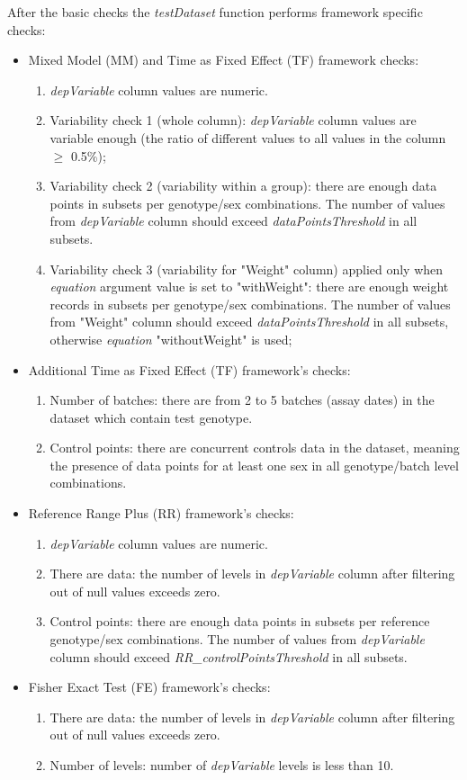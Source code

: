 \documentclass[12pt,a4paper]{article}
\begin{document}
After the basic checks the \textit{testDataset} function performs framework specific checks:
\begin{itemize}
\item Mixed Model (MM) and Time as Fixed Effect (TF) framework checks:
\begin{enumerate}
\item \textit{depVariable} column values are numeric.
\item Variability check 1  (whole column): \textit{depVariable} column values are variable enough (the ratio of different values to all values in the column $\geq$ 0.5\%);
\item Variability check 2 (variability within a group): there are enough data points in subsets per genotype/sex combinations. The number of values from \textit{depVariable} column should exceed \textit{dataPointsThreshold} in all subsets.
\item Variability check 3 (variability for "Weight" column) applied only when \textit{equation} argument value is set to "withWeight": there are enough weight records in subsets per genotype/sex combinations. The number of values from "Weight" column should exceed \textit{dataPointsThreshold} in all subsets, otherwise \textit{equation} "withoutWeight" is used;
\end{enumerate}
\item Additional Time as Fixed Effect (TF) framework's checks:
\begin{enumerate}
\item Number of batches: there are from 2 to 5 batches (assay dates) in the dataset which contain test genotype.
\item Control points: there are concurrent controls data in the dataset, meaning the presence of data points for at least one sex in all genotype/batch level combinations.
\end{enumerate}
\item Reference Range Plus (RR) framework's checks:
\begin{enumerate}
\item \textit{depVariable} column values are numeric.
\item There are data: the number of levels in \textit{depVariable} column after filtering out of null values exceeds zero. 
\item Control points: there are enough data points in subsets per reference genotype/sex combinations. The number of values from \textit{depVariable} column should exceed \textit{RR\_controlPointsThreshold} in all subsets. 
\end{enumerate}
\item Fisher Exact Test (FE) framework's checks: 
\begin{enumerate}
\item There are data: the number of levels in \textit{depVariable} column after filtering out of null values exceeds zero.
\item Number of levels: number of \textit{depVariable} levels is less than 10.
\end{enumerate}
\end{itemize}
\end{document}
